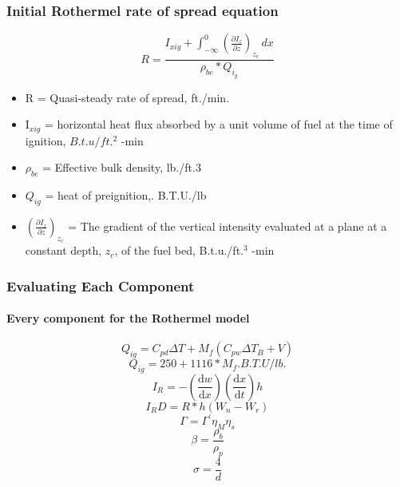 \documentclass{beamer}
\begin{document}
	
	\begin{frame}
		\frametitle{Initial Rothermel rate of spread equation}
				\begin{equation}
					R = \frac {I_{xig} + \int_{-\infty}^{0} (\frac {\partial I_{z}} {\partial z})_{z_c}\,dx }{\rho_{be} * Q_{i_g}}
					\label{Equation 1}
				\end{equation}
			\begin{itemize}
			\setlength{\itemsep}{5mm}
		\item R = Quasi-steady rate of spread, ft./min. \\

		\item I$_{xig}$ = horizontal heat flux absorbed by a unit volume of fuel at the time of ignition, $B.t.u/ft.^2$ -min \\

		\item $\rho_{be}$ = Effective bulk density, lb./ft.3 \\

		\item $Q_{ig}$ = heat of preignition,. B.T.U./lb \\

		\item $(\frac {\partial {I_z}} {\partial z})_{z_c}$ = The gradient of the vertical intensity evaluated at a plane at a constant depth, $z_c$, of the fuel bed, B.t.u./ft.$^3$ -min \\
		\end{itemize}
	\end{frame}



	\begin{frame}
		\frametitle{Evaluating Each Component}
	\framesubtitle{Every component for the Rothermel model}
	\begin{equation}
	Q_{ig} = C_{pd}\Delta T + M_f (C_{pw} \Delta T_B + V)
	\label{qig}
\end{equation}
\begin{equation}
\label{qig_final}
	Q_{ig} = 250 + 1116 * M_f. B.T.U/lb. 
\end{equation}
	\begin{equation}
	\label{I_R}
	I_R = - (\frac {\mathrm {d}w} {\mathrm{d} x}) (\frac {\mathrm {d}x} {\mathrm{d} t}) h 
	\end{equation}
\begin{equation}
	\label{Equation 5}
	I_R D = R*h (W_n - W_r)
	\end{equation}
\begin{equation}
	\label{reaction velocity}
	\Gamma = \Gamma ^ {'} \eta _ M \eta _ s
\end{equation}
	 \begin{equation}
 	\beta = \frac {\rho _ b } {\rho _ p} 
 	\label{beta_rothermel}
 \end{equation}
\begin{equation}
	\label{Equation 9}
	\sigma = \frac {4} {d}
\end{equation}

	\end{frame}
	
\end{document}
